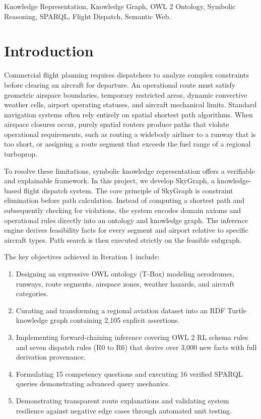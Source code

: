 \documentclass[conference]{IEEEtran}
\begin{document}
\begin{IEEEkeywords}
Knowledge Representation, Knowledge Graph, OWL 2 Ontology, Symbolic Reasoning, SPARQL, Flight Dispatch, Semantic Web.
\end{IEEEkeywords}

\section{Introduction}
Commercial flight planning requires dispatchers to analyze complex constraints before clearing an aircraft for departure. An operational route must satisfy geometric airspace boundaries, temporary restricted areas, dynamic convective weather cells, airport operating statuses, and aircraft mechanical limits. Standard navigation systems often rely entirely on spatial shortest path algorithms. When airspace closures occur, purely spatial routers produce paths that violate operational requirements, such as routing a widebody airliner to a runway that is too short, or assigning a route segment that exceeds the fuel range of a regional turboprop.

To resolve these limitations, symbolic knowledge representation offers a verifiable and explainable framework. In this project, we develop SkyGraph, a knowledge-based flight dispatch system. The core principle of SkyGraph is constraint elimination before path calculation. Instead of computing a shortest path and subsequently checking for violations, the system encodes domain axioms and operational rules directly into an ontology and knowledge graph. The inference engine derives feasibility facts for every segment and airport relative to specific aircraft types. Path search is then executed strictly on the feasible subgraph.

The key objectives achieved in Iteration 1 include:
\begin{enumerate}
    \item Designing an expressive OWL ontology (T-Box) modeling aerodromes, runways, route segments, airspace zones, weather hazards, and aircraft categories.
    \item Curating and transforming a regional aviation dataset into an RDF Turtle knowledge graph containing 2,105 explicit assertions.
    \item Implementing forward-chaining inference covering OWL 2 RL schema rules and seven dispatch rules (R0 to R6) that derive over 3,000 new facts with full derivation provenance.
    \item Formulating 15 competency questions and executing 16 verified SPARQL queries demonstrating advanced query mechanics.
    \item Demonstrating transparent route explanations and validating system resilience against negative edge cases through automated unit testing.
\end{enumerate}
\end{document}
